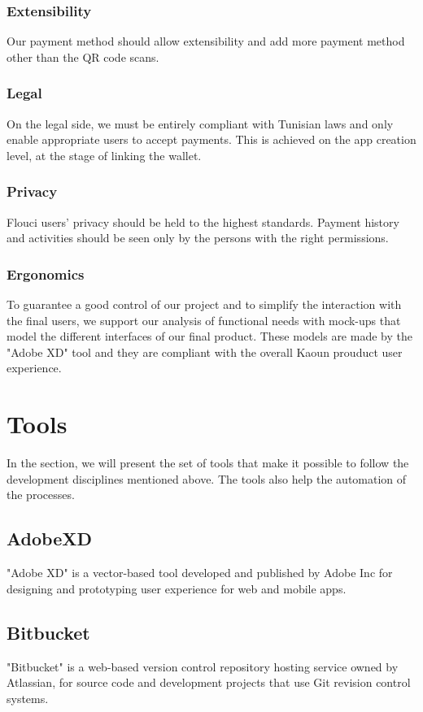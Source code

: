 \begin{spacing}{1.2}
\subsubsection{Extensibility}
Our payment method should allow extensibility and add more payment method other than the QR code scans.
\subsubsection{Legal}
On the legal side, we must be entirely compliant with Tunisian laws and only enable appropriate users to accept payments.
This is achieved on the app creation level, at the stage of linking the wallet.
\subsubsection{Privacy}
Flouci users' privacy should be held to the highest standards. Payment history and activities should be seen only by the persons with the right permissions.
\subsubsection{Ergonomics}
To guarantee a good control of our project and to simplify the interaction with the final users, we support our analysis of functional needs with mock-ups that model the different interfaces of our final product. These models are made by the "Adobe XD" tool and they are compliant with the overall Kaoun prouduct user experience.

\section{Tools}
In the section, we will present the set of tools that make it possible to follow the development disciplines mentioned above. The tools also help the automation of the processes.
\subsection{AdobeXD}
"Adobe XD" \cite{AdobeXD} is a vector-based tool developed and published by Adobe Inc for designing and prototyping user experience for web and mobile apps.
\subsection{Bitbucket}
"Bitbucket" \cite{Bitbucket} is a web-based version control repository hosting service owned by Atlassian, for source code and development projects that use Git revision control systems.

\end{spacing}

